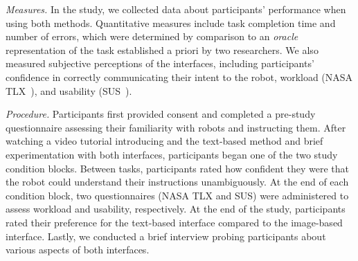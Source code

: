 

\emph{Measures.} In the study, we collected data about participants' performance when using both methods. Quantitative measures include task completion time and number of errors, which were determined by comparison to an \textit{oracle} representation of the task established a priori by two researchers. We also measured subjective perceptions of the interfaces, including participants' confidence in correctly communicating their intent to the robot, workload (NASA TLX~\cite{hart2006nasa}), and usability (SUS~\cite{bangor2008empirical}).

\emph{Procedure.} Participants first provided consent and completed a pre-study questionnaire assessing their familiarity with robots and instructing them. After watching a video tutorial introducing \projname and the text-based method and brief experimentation with both interfaces, participants began one of the two study condition blocks. Between tasks, participants rated how confident they were that the robot could understand their instructions unambiguously. At the end of each condition block, two questionnaires (NASA TLX and SUS) were administered to assess workload and usability, respectively. At the end of the study, participants rated their preference for the text-based interface compared to the image-based interface. Lastly, we conducted a brief interview probing participants about various aspects of both interfaces.






